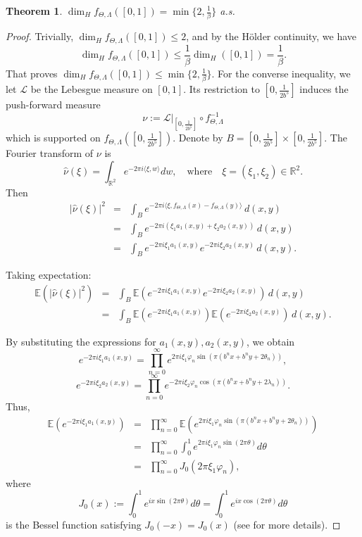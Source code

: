 \documentclass[12pt, reqno]{amsart}
\theoremstyle{plain}
\newtheorem{theorem}{Theorem}[section]
\theoremstyle{definition}
\theoremstyle{remark}
\begin{document}
\bigskip	
 
\begin{theorem}\label{thm2.1}
 	$\dim_H f_{\Theta,\Lambda}([0,1]) = \min\{2, \frac{1}{\beta}\}$ a.s.
 \end{theorem}
 	
 \begin{proof}
 	 Trivially, $\dim_H f_{\Theta,\Lambda}([0,1]) \le 2$, and by the H\"older continuity, we have
 	\[
 	\dim_H f_{\Theta,\Lambda}([0,1]) \le \frac{1}{\beta} \dim_H([0,1]) = \frac{1}{\beta}.
 	\]
 	That proves $\dim_H f_{\Theta,\Lambda}([0,1]) \le \min\{2, \frac{1}{\beta}\}$. For the converse inequality, we let  \( {\mathcal L} \) be the Lebesgue measure on \([0,1]\). Its restriction to $[0, \frac{1}{2b^5}]$  induces the push-forward measure $$\nu := \mathcal{L}|_{[0, \frac{1}{2b^5}]} \circ f_{\Theta,\Lambda}^{-1}$$  which is supported on $f_{\Theta,\Lambda}([0, \frac{1}{2b^5}])$.  Denote by $B=[0, \frac{1}{2b^5}]\times [0, \frac{1}{2b^5}]$.	The Fourier transform of $\nu$ is
 	\[
 	\hat{\nu}(\xi) = \int_{\mathbb{R}^2} e^{-2\pi i \langle \xi, w \rangle} dw,
 	\quad \text{where} \quad  \xi = (\xi_1, \xi_2) \in \mathbb{R}^2.
 	\]
 	Then
 \begin{eqnarray*}
 	 	|\hat{\nu}(\xi)|^2
 	 &=& \int_{B} e^{-2\pi i \langle \xi, f_{\Theta,\Lambda}(x) - f_{\Theta,\Lambda}(y) \rangle} \, d(x,y) \\
 	 &=& \int_{B} e^{-2\pi i (\xi_1 a_1(x,y) + \xi_2 a_2(x,y))} \, d(x,y) \\ 	 
 	 &=& \int_{B} e^{-2\pi i \xi_1 a_1(x,y)} e^{-2\pi i \xi_2 a_2(x,y)} \, d(x,y).
 \end{eqnarray*}
 
 
 	Taking expectation:
 \begin{eqnarray*}
 	\mathbb{E}\left(|\hat{\nu}(\xi)|^2\right)
 	&=& \int_{B} \mathbb{E}\left(e^{-2\pi i \xi_1 a_1(x,y)} e^{-2\pi i \xi_2 a_2(x,y)}\right)\, d(x,y) \\
 	&=& \int_{B} \mathbb{E}\left(e^{-2\pi i \xi_1 a_1(x,y)}\right) \mathbb{E}\left(e^{-2\pi i \xi_2 a_2(x,y)}\right) \, d(x,y).
 \end{eqnarray*}
 	
By substituting the expressions for \(a_1(x,y), a_2(x,y)\), we obtain
 	\[
 	e^{-2\pi i \xi_1 a_1(x,y)}
  	= \prod_{n=0}^\infty e^{2\pi i \xi_1 \varphi_n \sin(\pi(b^n x + b^n y + 2\theta_n))},
 	\]
 	\[
 	e^{-2\pi i \xi_2 a_2(x,y)}
 	= \prod_{n=0}^\infty e^{-2\pi i \xi_2 \varphi_n \cos(\pi(b^n x + b^n y + 2\lambda_n))}.
 	\]
 	Thus,
  \begin{eqnarray*}
 	\mathbb{E}\left(e^{-2\pi i \xi_1 a_1(x,y)}\right)
 	&=& \prod_{n=0}^\infty \mathbb{E}\left(e^{2\pi i \xi_1 \varphi_n \sin(\pi(b^n x + b^n y + 2\theta_n))}\right) \\
    &=& \prod_{n=0}^\infty \int_0^1 e^{2\pi i \xi_1 \varphi_n \sin(2\pi \theta)} d\theta\\
 	&=& \prod_{n=0}^\infty J_0\left(2\pi \xi_1 \varphi_n\right),
 \end{eqnarray*}
 	where $$J_0(x) := \int_0^1 e^{i x \sin(2\pi \theta)} d\theta = \int_0^1 e^{i x \cos(2\pi \theta)} d\theta$$ is the Bessel function satisfying $J_0(-x)=J_0(x)$ (see \cite {Mattila2015} for more details).
 	

\end{proof}
\end{document}
